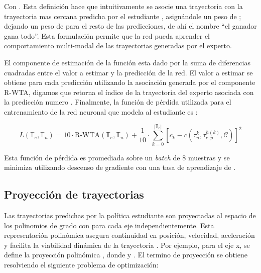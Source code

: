 Con . Esta definición hace que intuitivamente se asocie una trayectoria  con la trayectoria mas cercana predicha por el estudiante , asignándole un peso de ; dejando un peso de  para el resto de las predicciones, de ahí el nombre ``el ganador gana todo''. Esta formulación permite que la red pueda aprender el comportamiento multi-modal de las trayectorias generadas por el experto.

El componente de estimación de la función  esta dado por la suma de diferencias cuadradas entre el valor a estimar y la predicción de la red. El valor a estimar se obtiene para cada predicción utilizando la asociación generada por el componente R-WTA, digamos que  retorna el índice de la trayectoria del experto asociada con la predicción numero . Finalmente, la función de pérdida utilizada para el entrenamiento de la red neuronal que modela al estudiante es \cite{Loquercio2021}:

\begin{equation}
\label{eq:aoa-student-spacial-loss-full}
    L(\mathbb{T}_e, \mathbb{T}_n) = 10 \cdot \text{R-WTA}(\mathbb{T}_e, \mathbb{T}_n) + \frac{1}{10} \cdot \sum_{k=0}^{|\mathbb{T}_e|} [c_k - c(\tau_{n}^{k}, \tau_{e,p}^{h(k)}, \mathcal{C})]^2
\end{equation}

Esta función de pérdida es promediada sobre un \textit{batch} de 8 muestras y se minimiza utilizando descenso de gradiente con una tasa de aprendizaje de  \cite{Loquercio2021}.

\subsection{Proyección de trayectorias} 

\label{sec:prev-aoa-traj}

Las trayectorias predichas por la política estudiante son proyectadas al espacio de los polinomios de grado  con  para cada eje independientemente. Esta representación polinómica asegura continuidad en posición, velocidad, aceleración y facilita la viabilidad dinámica de la trayectoria \cite{mellinger2011minimum}. Por ejemplo, para el eje x, se define la proyección polinómica , donde  y . El termino de proyección  se obtiene resolviendo el siguiente problema de optimización:

